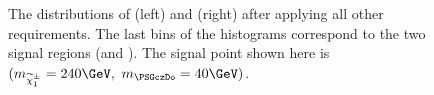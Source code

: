 \begin{figure}[!Hhtb]
\caption{The distributions of \mttwo (left) and \SumMT (right) after applying all other requirements. 
The last bins of the histograms correspond to the two signal regions (\binone and \bintwo). The signal point shown here is $(m_{\chione}=240\GeV,~m_{\PSGczDo}=40\GeV)$.}
\label{fig:comparison}
\end{figure}
